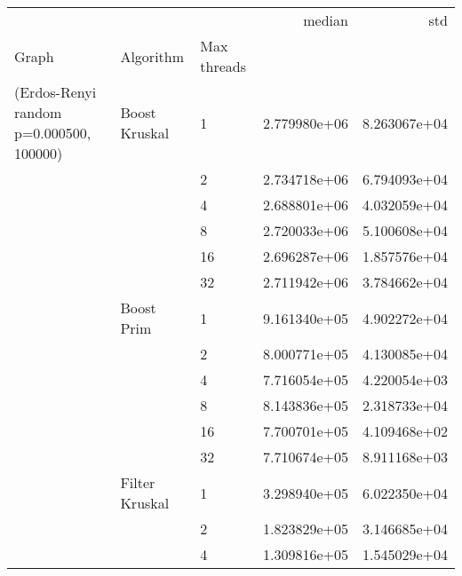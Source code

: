 \begin{tabular}{lllrr}
\toprule
                                                       &                     &    &        median &           std \\
Graph & Algorithm & Max threads &               &               \\
\midrule
(Erdos-Renyi random p=0.000500, 100000) & Boost Kruskal & 1  &  2.779980e+06 &  8.263067e+04 \\
                                                       &                     & 2  &  2.734718e+06 &  6.794093e+04 \\
                                                       &                     & 4  &  2.688801e+06 &  4.032059e+04 \\
                                                       &                     & 8  &  2.720033e+06 &  5.100608e+04 \\
                                                       &                     & 16 &  2.696287e+06 &  1.857576e+04 \\
                                                       &                     & 32 &  2.711942e+06 &  3.784662e+04 \\
                                                       & Boost Prim & 1  &  9.161340e+05 &  4.902272e+04 \\
                                                       &                     & 2  &  8.000771e+05 &  4.130085e+04 \\
                                                       &                     & 4  &  7.716054e+05 &  4.220054e+03 \\
                                                       &                     & 8  &  8.143836e+05 &  2.318733e+04 \\
                                                       &                     & 16 &  7.700701e+05 &  4.109468e+02 \\
                                                       &                     & 32 &  7.710674e+05 &  8.911168e+03 \\
                                                       & Filter Kruskal & 1  &  3.298940e+05 &  6.022350e+04 \\
                                                       &                     & 2  &  1.823829e+05 &  3.146685e+04 \\
                                                       &                     & 4  &  1.309816e+05 &  1.545029e+04 \\

\end{tabular}
